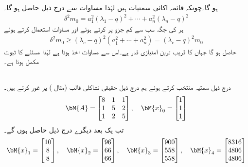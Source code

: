 ہو گا۔چونکہ  قائمہ اکائی سمتیات ہیں لہٰذا مساوات  سے درج ذیل حاصل ہو گا۔
\begin{align*}
\delta^2m_0=a_1^2(\lambda_1-q)^2+\cdots+a_n^2(\lambda_n-q)^2
\end{align*}
ہر  کی جگہ  سب سے  کم جزو پر کرتے ہوئے اور مساوات  استعمال کرتے ہوئے
\begin{align*}
\delta^2m_0\ge (\lambda_c-q)^2(a_1^2+\cdots+a_n^2)=(\lambda_c-q)^2m_0
\end{align*}
حاصل ہو گا جہاں  کا قریب ترین امتیازی قدر  ہے۔اس سے مساوات  اخذ ہوتا ہے لہٰذا مسئلے کا ثبوت مکمل ہوتا ہے۔

\quad {}\\
درج ذیل سمتیہ  منتخب کرتے ہوئے ہم درج ذیل حقیقی تشاکلی قالب   (مثال ) پر غور کرتے ہیں۔
\begin{align*}
\bM{A}=\begin{bmatrix} 8&1&1\\1&5&2\\1&2&5 \end{bmatrix},\quad \bM{x}_0=\begin{bmatrix}1\\1\\1  \end{bmatrix}
\end{align*}
تب یک بعد دیگرے درج ذیل حاصل ہوں گے۔
\begin{align*}
\bM{x}_1=\begin{bmatrix}10\\8\\8 \end{bmatrix},\quad
\bM{x}_2=\begin{bmatrix} 96\\66\\66 \end{bmatrix},\quad
\bM{x}_3=\begin{bmatrix} 900\\558\\558 \end{bmatrix},\quad
\bM{x}_4=\begin{bmatrix}8316\\4806\\4806 \end{bmatrix}
\end{align*}
